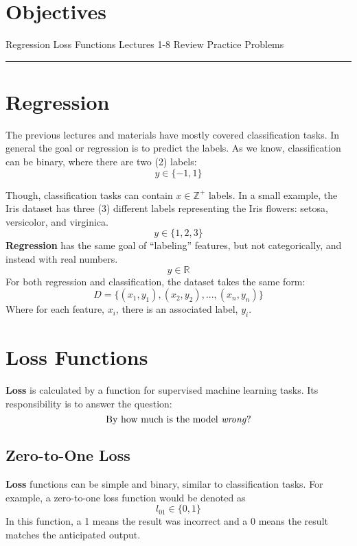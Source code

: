 
\section*{Objectives}
\begin{outline}
    \1 Regression
    \1 Loss Functions
    \1 Lectures 1-8 Review
    \1 Practice Problems
\end{outline}

\rule[0.0051in]{\textwidth}{0.00025in}

\section{Regression}
The previous lectures and materials have mostly covered classification tasks. In general the goal or regression is to predict the labels.  As we know, classification can be binary, where there are two (2) labels: 
\[
y \in \{-1, 1\}
\]

Though, classification tasks can contain $x\mathbb{\in Z^+}$ labels. In a small example, the Iris dataset has three (3) different labels representing the Iris flowers: setosa, versicolor, and virginica.
\[
y \in \{1, 2, 3\}
\]
\textbf{Regression} has the same goal of ``labeling'' features, but not categorically, and instead with real numbers.
\[
y \in \mathbb{R}
\]
For both regression and classification, the dataset takes the same form:
\[
D = \{(x_1, y_1), (x_2, y_2),...,(x_n, y_n)\}
\]
Where for each feature, $x_i$, there is an associated label, $y_i$.

\section{Loss Functions}
\textbf{Loss} is calculated by a function for supervised machine learning tasks. Its responsibility is to answer the question: 
\[
\text{By how much is the model \textit{wrong}?}
\]

\subsection{Zero-to-One Loss}
\textbf{Loss} functions can be simple and binary, similar to classification tasks. For example, a zero-to-one loss function would be denoted as
\[
l_{01} \in \{0, 1\}
\]
In this function, a 1 means the result was incorrect and a 0 means the result matches the anticipated output.

